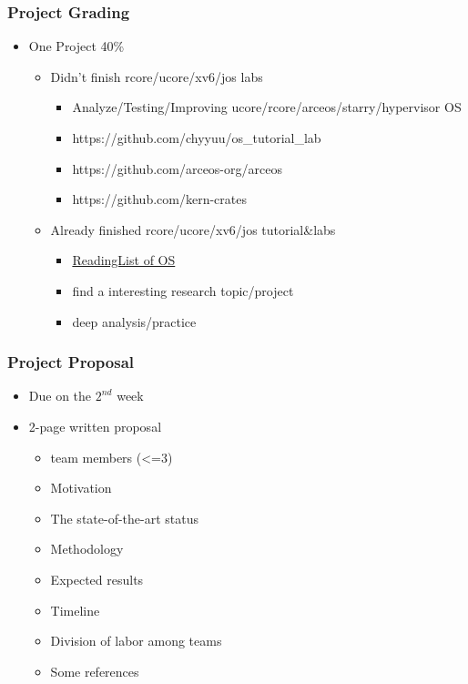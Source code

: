 \begin{frame}[plain]	
	\frametitle{Project Grading}
	
	\begin{itemize}\Large
		\item One Project		40\%
		\begin{itemize}\large
			\item Didn't finish rcore/ucore/xv6/jos labs
			\begin{itemize}\large
				\item Analyze/Testing/Improving ucore/rcore/arceos/starry/hypervisor OS
				\item https://github.com/chyyuu/os\_tutorial\_lab
				\item https://github.com/arceos-org/arceos
				\item https://github.com/kern-crates
				
			\end{itemize}\pause
			\item Already finished rcore/ucore/xv6/jos tutorial\&labs
			\begin{itemize}\large
				\item \href{https://github.com/chyyuu/aos_course/blob/master/readinglist.md}{ReadingList of OS}
				\item find a interesting research topic/project
				\item deep analysis/practice
			\end{itemize}
		\end{itemize}
	\end{itemize}
	
	
\end{frame}

\begin{frame}[plain]	
	\frametitle{Project Proposal}
	
	\begin{itemize}\Large
		\item Due on the $ 2^{nd} $ week
		\item 2-page written proposal
		\begin{itemize}\large
			\item team members (<=3)
			\item Motivation
			\item The state-of-the-art status
			\item Methodology
			\item Expected results
			\item Timeline
			\item Division of labor among teams
			\item Some references
			
		\end{itemize}
	\end{itemize}
	
	
\end{frame}

